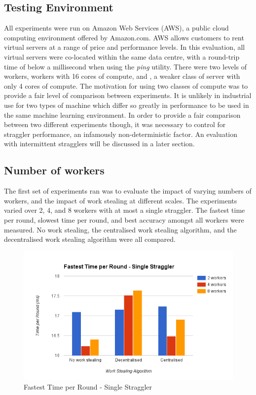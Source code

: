 \documentclass[12pt]{article}
\begin{document}
\subsection{Testing Environment}
All experiments were run on Amazon Web Services (AWS), a public cloud computing environment offered by Amazon.com. AWS allows customers to rent virtual servers at a range of price and performance levels. In this evaluation, all virtual servers were co-located within the same data centre, with a round-trip time of below a millisecond when using the \textit{ping} utility. There were two levels of workers,  workers with 16 cores of compute, and , a weaker class of server with only 4 cores of compute. The motivation for using two classes of compute was to provide a fair level of comparison between experiments. It is unlikely in industrial use for two types of machine which differ so greatly in performance to be used in the same machine learning environment. In order to provide a fair comparison between two different experiments though, it was necessary to control for straggler performance, an infamously non-deterministic factor. An evaluation with intermittent stragglers will be discussed in a later section.

\subsection{Number of workers}
The first set of experiments ran was to evaluate the impact of varying numbers of workers, and the impact of work stealing at different scales. The experiments varied over 2, 4, and 8 workers with at most a single straggler. The fastest time per round, slowest time per round, and best accuracy amongst all workers were measured. No work stealing, the centralised work stealing algorithm, and the decentralised work stealing algorithm were all compared.
\newline
\newline

\begin{figure}[H]
  \centering
  \includegraphics[width=6in]{FastestSingle}
  \caption[]{Fastest Time per Round - Single Straggler}
  \label{FastestSingle}
\end{figure}
\end{document}
